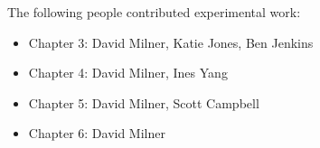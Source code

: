 \noindent The following people contributed experimental work:
\begin{itemize}
    \item Chapter 3: David Milner, Katie Jones, Ben Jenkins
    \item Chapter 4: David Milner, Ines Yang
    \item Chapter 5: David Milner, Scott Campbell
    \item Chapter 6: David Milner 
\end{itemize}
